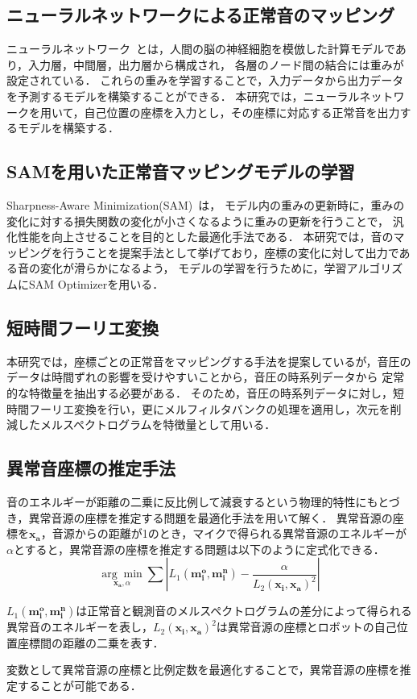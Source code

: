 \documentclass[../main]{subfiles}
\begin{document}
\subsection{ニューラルネットワークによる正常音のマッピング}
ニューラルネットワーク~\cite{Rumelhart1986}とは，人間の脳の神経細胞を模倣した計算モデルであり，入力層，中間層，出力層から構成され，
各層のノード間の結合には重みが設定されている．
これらの重みを学習することで，入力データから出力データを予測するモデルを構築することができる．
本研究では，ニューラルネットワークを用いて，自己位置の座標を入力とし，その座標に対応する正常音を出力するモデルを構築する．
\subsection{SAMを用いた正常音マッピングモデルの学習}
Sharpness-Aware Minimization(SAM)~\cite{Foret2020}は，
モデル内の重みの更新時に，重みの変化に対する損失関数の変化が小さくなるように重みの更新を行うことで，
汎化性能を向上させることを目的とした最適化手法である．
本研究では，音のマッピングを行うことを提案手法として挙げており，座標の変化に対して出力である音の変化が滑らかになるよう，
モデルの学習を行うために，学習アルゴリズムにSAM Optimizerを用いる．
\subsection{短時間フーリエ変換}
本研究では，座標ごとの正常音をマッピングする手法を提案しているが，音圧のデータは時間ずれの影響を受けやすいことから，音圧の時系列データから
定常的な特徴量を抽出する必要がある．
そのため，音圧の時系列データに対し，短時間フーリエ変換を行い，更にメルフィルタバンクの処理を適用し，次元を削減したメルスペクトログラムを特徴量として用いる．
\subsection{異常音座標の推定手法}
音のエネルギーが距離の二乗に反比例して減衰するという物理的特性にもとづき，異常音源の座標を推定する問題を最適化手法を用いて解く．
異常音源の座標を$\mathbf{x_a}$，音源からの距離が1のとき，マイクで得られる異常音源のエネルギーが$\alpha$とすると，異常音源の座標を推定する問題は以下のように定式化できる．
\begin{equation}
  \underset{\mathbf{x_a}, \alpha}{\arg\min} \sum \left| L_1 (\mathbf{m_i^o}, \mathbf{m_i^n}) - \frac{\alpha}{L_2 (\mathbf{x_i}, \mathbf{x_a})^2} \right|
\end{equation}

$L_1 (\mathbf{m_i^o}, \mathbf{m_i^n})$は正常音と観測音のメルスペクトログラムの差分によって得られる異常音のエネルギーを表し，$L_2 (\mathbf{x_i}, \mathbf{x_a})^2$は異常音源の座標とロボットの自己位置座標間の距離の二乗を表す．

変数として異常音源の座標と比例定数を最適化することで，異常音源の座標を推定することが可能である．
\end{document}
